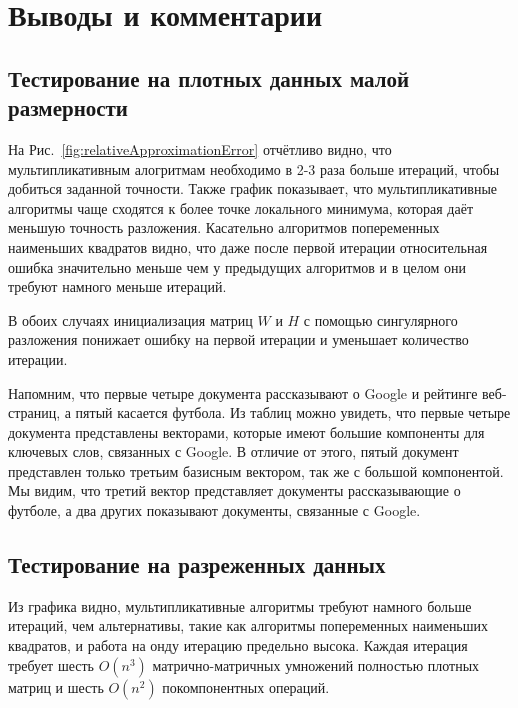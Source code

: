 \newpage





\section{Выводы и комментарии}

\subsection{Тестирование на плотных данных малой размерности}

На Рис.~\ref{fig:relativeApproximationError} отчётливо видно,
что мультипликативным алогритмам необходимо в 2-3 раза больше итераций, чтобы добиться заданной точности.
Также график показывает, что мультипликативные алгоритмы чаще сходятся к более  точке локального минимума,
которая даёт меньшую точность разложения.
Касательно алгоритмов попеременных наименьших квадратов видно, что даже после первой итерации
относительная ошибка значительно меньше чем у предыдущих алгоритмов и в целом они требуют намного меньше итераций.

В обоих случаях инициализация матриц $W$ и $H$ с помощью сингулярного разложения понижает ошибку на первой итерации и уменьшает количество итерации.

Напомним, что первые четыре документа рассказывают о Google и рейтинге веб-страниц,
а пятый касается футбола. Из таблиц можно увидеть, что первые четыре документа представлены векторами,
которые имеют большие компоненты для ключевых слов, связанных с Google.
В отличие от этого, пятый документ представлен только третьим базисным вектором, так же с большой компонентой.
Мы видим, что третий вектор представляет документы рассказывающие о футболе, а два других показывают документы, связанные с Google.


\newpage


\subsection{Тестирование на разреженных данных}

Из графика видно, мультипликативные алгоритмы требуют намного больше итераций, чем альтернативы,
такие как алгоритмы попеременных наименьших квадратов, и работа на онду итерацию предельно высока.
Каждая итерация требует шесть $O(n^3)$ матрично-матричных умножений полностью плотных матриц и шесть
$O (n^2)$ покомпонентных операций.

